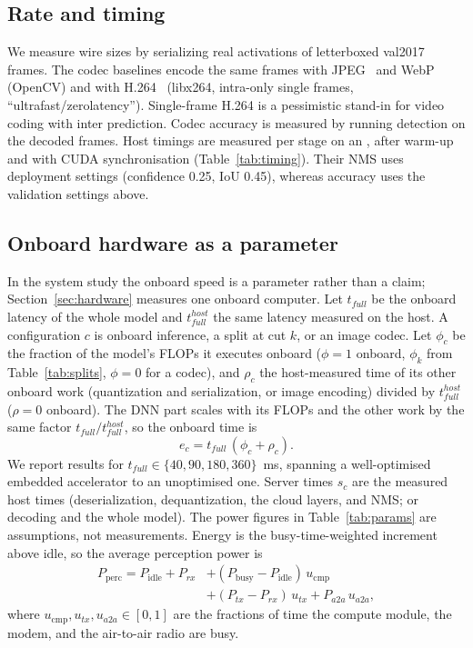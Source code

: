 \documentclass[journal,twocolumn,10pt]{IEEEtran}
\begin{document}
\subsection{Rate and timing}
We measure wire sizes by serializing real activations of \TimingImages{} letterboxed val2017 frames. The codec baselines encode the same frames with JPEG~\cite{wallace1992jpeg} and WebP (OpenCV) and with H.264~\cite{wiegand2003h264} (libx264, intra-only single frames, ``ultrafast/zerolatency''). Single-frame H.264 is a pessimistic stand-in for video coding with inter prediction. Codec accuracy is measured by running detection on the decoded frames. Host timings are measured per stage on an \HostGPU{}, after warm-up and with CUDA synchronisation (Table~\ref{tab:timing}). Their NMS uses deployment settings (confidence 0.25, IoU 0.45), whereas accuracy uses the validation settings above.

\subsection{Onboard hardware as a parameter}\label{sec:model-hw}
In the system study the onboard speed is a parameter rather than a claim; Section~\ref{sec:hardware} measures one onboard computer. Let $t_{full}$ be the onboard latency of the whole model and $t^{host}_{full}$ the same latency measured on the host. A configuration $c$ is onboard inference, a split at cut $k$, or an image codec. Let $\phi_c$ be the fraction of the model's FLOPs it executes onboard ($\phi=1$ onboard, $\phi_k$ from Table~\ref{tab:splits}, $\phi=0$ for a codec), and $\rho_c$ the host-measured time of its other onboard work (quantization and serialization, or image encoding) divided by $t^{host}_{full}$ ($\rho=0$ onboard). The DNN part scales with its FLOPs and the other work by the same factor $t_{full}/t^{host}_{full}$, so the onboard time is
\begin{equation*}
e_c = t_{full}\,(\phi_c+\rho_c).
\end{equation*}
We report results for $t_{full}\in\{40,90,180,360\}$~ms, spanning a well-optimised embedded accelerator to an unoptimised one. Server times $s_c$ are the measured host times (deserialization, dequantization, the cloud layers, and NMS; or decoding and the whole model). The power figures in Table~\ref{tab:params} are assumptions, not measurements. Energy is the busy-time-weighted increment above idle, so the average perception power is
\begin{align*}
P_{\mathrm{perc}} = P_{\mathrm{idle}}+P_{rx} &+ (P_{\mathrm{busy}}-P_{\mathrm{idle}})\,u_{\mathrm{cmp}}\\
&+ (P_{tx}-P_{rx})\,u_{tx}+P_{a2a}\,u_{a2a},
\end{align*}
where $u_{\mathrm{cmp}},u_{tx},u_{a2a}\in[0,1]$ are the fractions of time the compute module, the modem, and the air-to-air radio are busy.
\end{document}
